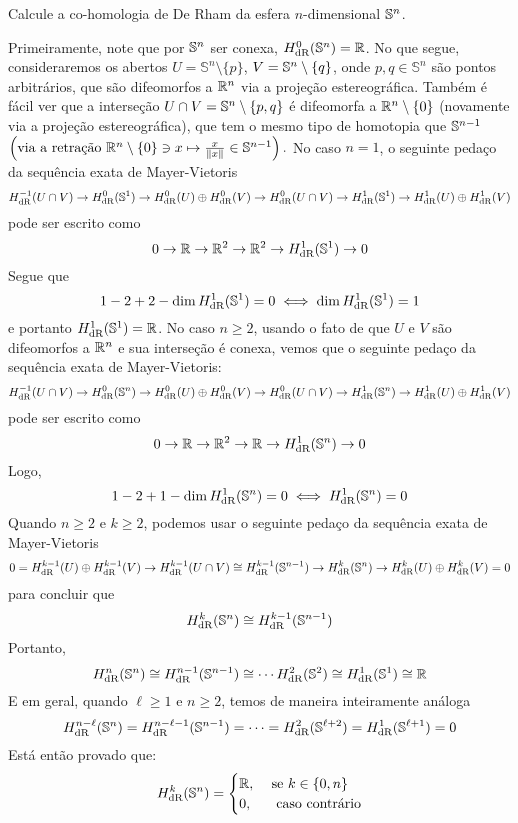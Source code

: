 \begin{Mybox}
Calcule a co-homologia de De Rham da esfera $n$-dimensional $\S^n$.
\vspace{-.4cm}
\end{Mybox}
\vspace{-.5cm}
\begin{dem}
Primeiramente, note que por $\S^n$ ser conexa, $H_{\text{dR}}^0(\S^n) = \R$. No que segue, consideraremos os abertos $U = \mathbb{S}^n \setminus \{p \}$, $V = \S^n \setminus \{ q \}$, onde $p, q \in \mathbb{S}^n$ são pontos arbitrários, que são difeomorfos a $\R^n$ via a projeção estereográfica. Também é fácil ver que a interseção $U \cap V = \S^n \setminus \{p, q\}$ é difeomorfa a $\R^n \setminus \{0 \}$ (novamente via a projeção estereográfica), que tem o mesmo tipo de homotopia que $\S^{n-1}$ $\left( \text{via a retração $\R^n \setminus \{0 \} \ni x \mapsto \frac{x}{\|x\|} \in \S^{n-1}$} \right).$ No caso $n = 1$, o seguinte pedaço da sequência exata de Mayer-Vietoris
\[H_{\text{dR}}^{-1}(U \cap V) \to H_{\text{dR}}^0(\S^1) \to H_{\text{dR}}^0(U) \oplus H_{\text{dR}}^0(V) \to H_{\text{dR}}^0(U \cap V) \to H_{\text{dR}}^1(\S^1) \to H_{\text{dR}}^1(U) \oplus H_{\text{dR}}^1(V)
\]
pode ser escrito como
\[
0 \to \R \to \R^2 \to \R^2 \to H_{\text{dR}}^1(\S^1) \to 0
\]
Segue que 
\[1 - 2 + 2 - \dim H_{\text{dR}}^1(\S^1) = 0 \iff \dim H_{\text{dR}}^1(\S^1) = 1 \]
e portanto $H_{\text{dR}}^1(\S^1) = \R$. No caso $n \geq 2$, usando o fato de que $U$ e $V$ são difeomorfos a $\R^n$ e sua interseção é conexa, vemos que o seguinte pedaço da sequência exata de Mayer-Vietoris:
\[H_{\text{dR}}^{-1}(U \cap V) \to H_{\text{dR}}^0(\S^n) \to H_{\text{dR}}^0(U) \oplus H_{\text{dR}}^0(V) \to H_{\text{dR}}^0(U \cap V) \to H_{\text{dR}}^1(\S^n) \to H_{\text{dR}}^1(U) \oplus H_{\text{dR}}^1(V)
\]
pode ser escrito como
\[0 \to \R \to \R^2 \to \R \to H_{\text{dR}}^1(\S^n) \to 0\]
Logo,
\[ 1 - 2 + 1 - \dim H_{\text{dR}}^1(\S^n) = 0  \iff H_{\text{dR}}^1(\S^n) = 0
\]
Quando $n \geq 2$ e $k \geq 2$, podemos usar o seguinte pedaço da sequência exata de Mayer-Vietoris
\[
0 = H_{\text{dR}}^{k-1}(U) \oplus H_{\text{dR}}^{k-1}(V) \to H_{\text{dR}}^{k-1}(U \cap V ) \cong H_{\text{dR}}^{k-1}(\S^{n-1})  \to H_{\text{dR}}^k(\S^n) \to H_{\text{dR}}^k(U) \oplus H_{\text{dR}}^k(V)  = 0
\]
para concluir que \[H_{\text{dR}}^{k}(\S^n) \cong H_{\text{dR}}^{k-1}(\S^{n-1})\]
Portanto,
\[
H_{\text{dR}}^{n}(\S^n) \cong H_{\text{dR}}^{n-1}(\S^{n-1}) \cong \cdots H_{\text{dR}}^{2}(\S^2) \cong H_{\text{dR}}^{1}(\S^1) \cong \R
\]
E em geral, quando $\ell \geq 1$ e $n \geq 2$, temos de maneira inteiramente análoga
\[
H_{\text{dR}}^{n - \ell}(\S^n) = H_{\text{dR}}^{n - \ell - 1}(\S^{n-1}) = \cdots = H_{\text{dR}}^{2}(\S^{\ell + 2}) = H_{\text{dR}}^{1}(\S^{\ell + 1}) = 0
\]
Está então provado que:
$$
H_{\text{dR}}^k(\S^n) =\begin{cases}
\R, & \ \text{se } k \in \{0, n \} \\
0, & \ \text{ caso contrário}
\end{cases}
$$
\end{dem}



